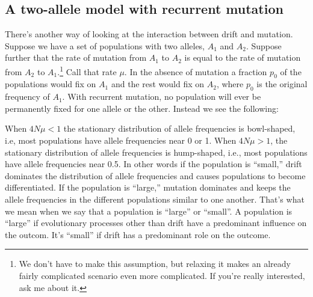 \documentclass[12pt]{article}
\begin{document}
\subsection*{A two-allele model with recurrent mutation}

There's another way of looking at the interaction between drift and
mutation. Suppose we have a set of populations with two alleles, $A_1$
and $A_2$. Suppose further that the rate of mutation from $A_1$ to
$A_2$ is equal to the rate of mutation from $A_2$ to
$A_1$.\footnote{We don't have to make this assumption, but relaxing it
makes an already fairly complicated scenario even more complicated. If
you're really interested, ask me about it.} Call that rate $\mu$. In
the absence of mutation a fraction $p_0$ of the populations would fix
on $A_1$ and the rest would fix on $A_2$, where $p_0$ is the original
frequency of $A_1$. With recurrent mutation, no population will ever
be permanently fixed for one allele or the other. Instead we see the
following:

\begin{center}
\end{center}

When $4N\mu < 1$ the stationary distribution of allele frequencies is
bowl-shaped, i.e, most populations have allele frequencies near 0 or
1. When $4N\mu > 1$, the stationary distribution of allele frequencies
is hump-shaped, i.e., most populations have allele frequencies near
0.5. In other words if the population is ``small,'' drift dominates
the distribution of allele frequencies and causes populations to
become differentiated. If the population is ``large,'' mutation
dominates and keeps the allele frequencies in the different
populations similar to one another. That's what we mean when we say
that a population is ``large'' or ``small''. A population is ``large''
if evolutionary processes other than drift have a predominant
influence on the outcom. It's ``small'' if drift has a predominant
role on the outcome.
\end{document}
